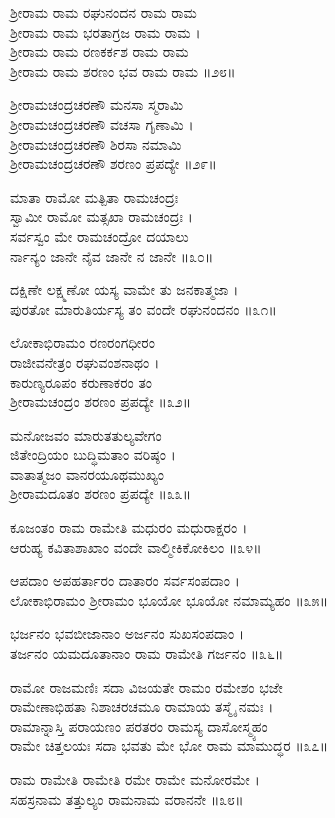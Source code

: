 ಶ್ರೀರಾಮ ರಾಮ ರಘುನಂದನ ರಾಮ ರಾಮ\\
ಶ್ರೀರಾಮ ರಾಮ ಭರತಾಗ್ರಜ ರಾಮ ರಾಮ ।\\
ಶ್ರೀರಾಮ ರಾಮ ರಣಕರ್ಕಶ ರಾಮ ರಾಮ\\
ಶ್ರೀರಾಮ ರಾಮ ಶರಣಂ ಭವ ರಾಮ ರಾಮ ॥೨೮॥

ಶ್ರೀರಾಮಚಂದ್ರಚರಣೌ ಮನಸಾ ಸ್ಮರಾಮಿ\\
ಶ್ರೀರಾಮಚಂದ್ರಚರಣೌ ವಚಸಾ ಗೃಣಾಮಿ ।\\
ಶ್ರೀರಾಮಚಂದ್ರಚರಣೌ ಶಿರಸಾ ನಮಾಮಿ\\
ಶ್ರೀರಾಮಚಂದ್ರಚರಣೌ ಶರಣಂ ಪ್ರಪದ್ಯೇ ॥೨೯॥

ಮಾತಾ ರಾಮೋ ಮತ್ಪಿತಾ ರಾಮಚಂದ್ರಃ\\
ಸ್ವಾಮೀ ರಾಮೋ ಮತ್ಸಖಾ ರಾಮಚಂದ್ರಃ ।\\
ಸರ್ವಸ್ವಂ ಮೇ ರಾಮಚಂದ್ರೋ ದಯಾಲು\\
ರ್ನಾನ್ಯಂ ಜಾನೇ ನೈವ ಜಾನೇ ನ ಜಾನೇ ॥೩೦॥

ದಕ್ಷಿಣೇ ಲಕ್ಷ್ಮಣೋ ಯಸ್ಯ ವಾಮೇ ತು ಜನಕಾತ್ಮಜಾ ।\\
ಪುರತೋ ಮಾರುತಿರ್ಯಸ್ಯ ತಂ ವಂದೇ ರಘುನಂದನಂ ॥೩೧॥

ಲೋಕಾಭಿರಾಮಂ ರಣರಂಗಧೀರಂ\\
ರಾಜೀವನೇತ್ರಂ ರಘುವಂಶನಾಥಂ ।\\
ಕಾರುಣ್ಯರೂಪಂ ಕರುಣಾಕರಂ ತಂ\\
ಶ್ರೀರಾಮಚಂದ್ರಂ ಶರಣಂ ಪ್ರಪದ್ಯೇ ॥೩೨॥

ಮನೋಜವಂ ಮಾರುತತುಲ್ಯವೇಗಂ\\
ಜಿತೇಂದ್ರಿಯಂ ಬುದ್ಧಿಮತಾಂ ವರಿಷ್ಠಂ ।\\
ವಾತಾತ್ಮಜಂ ವಾನರಯೂಥಮುಖ್ಯಂ\\
ಶ್ರೀರಾಮದೂತಂ ಶರಣಂ ಪ್ರಪದ್ಯೇ ॥೩೩॥

ಕೂಜಂತಂ ರಾಮ ರಾಮೇತಿ ಮಧುರಂ ಮಧುರಾಕ್ಷರಂ ।\\
ಆರುಹ್ಯ ಕವಿತಾಶಾಖಾಂ ವಂದೇ ವಾಲ್ಮೀಕಿಕೋಕಿಲಂ ॥೩೪॥

ಆಪದಾಂ ಅಪಹರ್ತಾರಂ ದಾತಾರಂ ಸರ್ವಸಂಪದಾಂ ।\\
ಲೋಕಾಭಿರಾಮಂ ಶ್ರೀರಾಮಂ ಭೂಯೋ ಭೂಯೋ ನಮಾಮ್ಯಹಂ ॥೩೫॥

ಭರ್ಜನಂ ಭವಬೀಜಾನಾಂ ಅರ್ಜನಂ ಸುಖಸಂಪದಾಂ ।\\
ತರ್ಜನಂ ಯಮದೂತಾನಾಂ ರಾಮ ರಾಮೇತಿ ಗರ್ಜನಂ ॥೩೬॥

ರಾಮೋ ರಾಜಮಣಿಃ ಸದಾ ವಿಜಯತೇ ರಾಮಂ ರಮೇಶಂ ಭಜೇ\\
ರಾಮೇಣಾಭಿಹತಾ ನಿಶಾಚರಚಮೂ ರಾಮಾಯ ತಸ್ಮೈ ನಮಃ ।\\
ರಾಮಾನ್ನಾಸ್ತಿ ಪರಾಯಣಂ ಪರತರಂ ರಾಮಸ್ಯ ದಾಸೋಸ್ಮ್ಯಹಂ\\
ರಾಮೇ ಚಿತ್ತಲಯಃ ಸದಾ ಭವತು ಮೇ ಭೋ ರಾಮ ಮಾಮುದ್ಧರ ॥೩೭॥

ರಾಮ ರಾಮೇತಿ ರಾಮೇತಿ ರಮೇ ರಾಮೇ ಮನೋರಮೇ ।\\
ಸಹಸ್ರನಾಮ ತತ್ತುಲ್ಯಂ ರಾಮನಾಮ ವರಾನನೇ ॥೩೮॥

